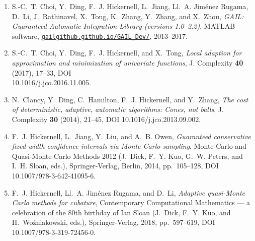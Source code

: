 \documentclass[11 pt]{NSFamsart}
\providecommand{\HickernellFJ}{Hickernell\xspace}
\begin{document}
\begin{enumerate} \renewcommand{\labelenumi}{[\arabic{enumi}]}

\item
S.-C.~T. Choi, Y.~Ding, F.~J. \HickernellFJ, L.~Jiang, {\relax Ll}.~A.
{Jim\'enez Rugama}, D.~Li, J.~Rathinavel, X.~Tong, K.~Zhang, Y.~Zhang, and
X.~Zhou, \emph{{GAIL}: {G}uaranteed {A}utomatic {I}ntegration {L}ibrary
	(versions 1.0--2.2)}, MATLAB software, \href{http://gailgithub.github.io/GAIL_Dev/} 
	{\nolinkurl{gailgithub.github.io/GAIL_Dev/}}, {2013--2017}.

\item S.-C.~T. Choi, Y.~Ding, F.~J. \HickernellFJ, and X.~Tong, \emph{Local adaption
	for approximation and minimization of univariate functions}, J. Complexity
\textbf{40} (2017), 17--33, {DOI} \\10.1016/j.jco.2016.11.005.

\item N.~Clancy, Y.~Ding, C.~Hamilton, F.~J. Hickernell, and Y.~Zhang, \emph{The cost
  of deterministic, adaptive, automatic algorithms: Cones, not balls}, J.
  Complexity \textbf{30} (2014), 21--45, {DOI} 10.1016/j.jco.2013.09.002.


 
\item F.~J. \HickernellFJ, L.~Jiang, Y.~Liu, and A.~B. Owen, \emph{Guaranteed conservative fixed width confidence intervals via {M}onte {C}arlo sampling}, {M}onte {C}arlo and Quasi-{M}onte {C}arlo Methods 2012 (J.~Dick, F.~Y. Kuo,
G.~W. Peters, and I.~H. Sloan, eds.), Springer-Verlag, Berlin, 2014, pp.~105--128,
 {DOI} 10.1007/978-3-642-41095-6.

\item
F.~J. \HickernellFJ, {\relax Ll}.~A. {Jim\'enez Rugama}, and D.~Li,
\emph{Adaptive quasi-{M}onte {C}arlo methods for cubature}, Contemporary
Computational Mathematics --- a celebration of the 80th birthday of {I}an
{S}loan (J.~Dick, F.~Y. Kuo, and H.~Wo\'zniakowski, eds.), Springer-Verlag,
2018, pp.~597--619, {DOI} 10.1007/978-3-319-72456-0.


  
  

\end{enumerate}
\end{document}
